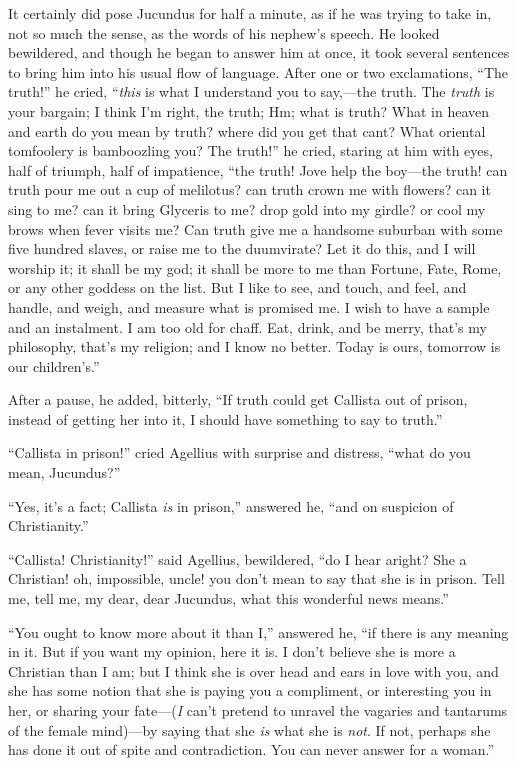 It certainly did pose Jucundus for half a minute, as if he was
trying to take in, not so much the sense, as the words of his nephew's
speech. He looked bewildered, and though he began to answer him at
once, it took several sentences to bring him into his usual flow of
language. After one or two exclamations, ``The truth!'' he
cried, ``\emph{this} is what I understand you to say,—the truth.
The \emph{truth} is your bargain; I think I'm right, the truth; Hm;
what is truth? What in heaven and earth do you mean by truth? where
did you get that cant? What oriental tomfoolery is bamboozling you?
The truth!'' he cried, staring at him with eyes, half of triumph,
half of impatience, ``the truth! Jove help the boy—the truth!
can truth pour me out a cup of melilotus? can truth crown me with
flowers? can it sing to me? can it bring Glyceris to me? drop gold
into my girdle? or cool my brows when fever visits me? Can truth give
me a handsome suburban with some five hundred slaves, or raise me to
the duumvirate? Let it do this, and I will worship it; it shall be my
god; it shall be more to me than Fortune, Fate, Rome, or any other
goddess on the list. But I like to see, and touch, and feel, and
handle, and weigh, and measure what is promised me. I wish to have a
sample and an instalment. I am too old for chaff. Eat, drink, and be
merry, that's my philosophy, that's my religion; and I know no
better. Today is ours, tomorrow is our children's.''

After a pause, he added, bitterly, ``If truth could get
Callista out of prison, instead of getting her into it, I should have
something to say to truth.''

``Callista in prison!'' cried Agellius with surprise and
distress, ``what do you mean, Jucundus?''

``Yes, it's a fact; Callista \emph{is} in prison,''
answered he, ``and on suspicion of Christianity.''

``Callista! Christianity!'' said Agellius, bewildered,
``do I hear aright? She a Christian! oh, impossible, uncle! you
don't mean to say that she is in prison. Tell me, tell me, my dear,
dear Jucundus, what this wonderful news means.''

``You ought to know more about it than I,'' answered he,
``if there is any meaning in it. But if you want my opinion, here
it is. I don't believe she is more a Christian than I am; but I think
she is over head and ears in love with you, and she has some notion
that she is paying you a compliment, or interesting you in her, or
sharing your fate—(\emph{I} can't pretend to unravel the vagaries
and tantarums of the female mind)—by saying that she \emph{is} what
she is \emph{not}. If not, perhaps she has done it out of spite and
contradiction. You can never answer for a woman.''

